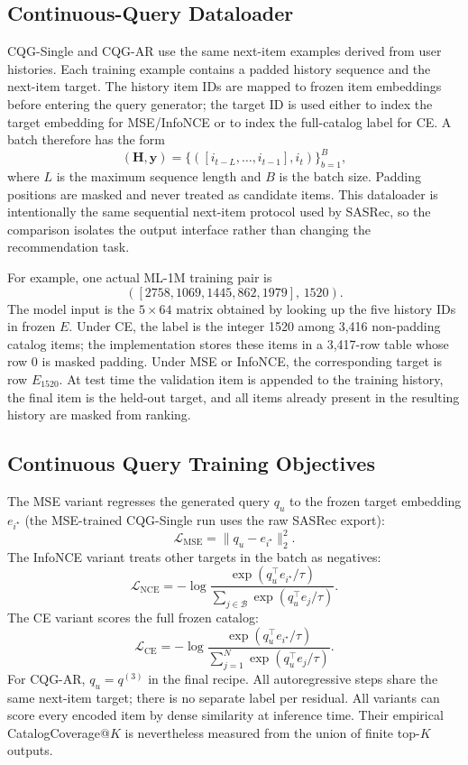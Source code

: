 \documentclass[letterpaper]{article}
\begin{document}
\subsection{Continuous-Query Dataloader}
\label{app:cqg_dataloader}

CQG-Single and CQG-AR use the same next-item examples derived from user histories. Each training example contains a padded history sequence and the next-item target. The history item IDs are mapped to frozen item embeddings before entering the query generator; the target ID is used either to index the target embedding for MSE/InfoNCE or to index the full-catalog label for CE. A batch therefore has the form
\[
(\mathbf{H}, \mathbf{y}) =
\{([i_{t-L},\ldots,i_{t-1}], i_t)\}_{b=1}^{B},
\]
where $L$ is the maximum sequence length and $B$ is the batch size. Padding positions are masked and never treated as candidate items. This dataloader is intentionally the same sequential next-item protocol used by SASRec, so the comparison isolates the output interface rather than changing the recommendation task.

For example, one actual ML-1M training pair is
\[
([2758,1069,1445,862,1979],\,1520).
\]
The model input is the \(5\times64\) matrix obtained by looking up the five
history IDs in frozen \(E\). Under CE, the label is the integer 1520 among
3,416 non-padding catalog items; the implementation stores these items in a
3,417-row table whose row 0 is masked padding. Under MSE or InfoNCE, the
corresponding target is row \(E_{1520}\). At test time the validation item is appended to the
training history, the final item is the held-out target, and all items already
present in the resulting history are masked from ranking.

\subsection{Continuous Query Training Objectives}
\label{app:cqg_losses}

The MSE variant regresses the generated query $q_u$ to the frozen target embedding $e_{i^\star}$ (the MSE-trained CQG-Single run uses the raw SASRec export):
\[
\mathcal{L}_{\mathrm{MSE}} =
\|q_u - e_{i^\star}\|_2^2.
\]
The InfoNCE variant treats other targets in the batch as negatives:
\[
\mathcal{L}_{\mathrm{NCE}} =
-\log
\frac{\exp(q_u^\top e_{i^\star}/\tau)}
{\sum_{j\in\mathcal{B}}\exp(q_u^\top e_j/\tau)}.
\]
The CE variant scores the full frozen catalog:
\[
\mathcal{L}_{\mathrm{CE}} =
-\log
\frac{\exp(q_u^\top e_{i^\star}/\tau)}
{\sum_{j=1}^{N}\exp(q_u^\top e_j/\tau)}.
\]
For CQG-AR, \(q_u=q^{(3)}\) in the final recipe.  All autoregressive steps
share the same next-item target; there is no separate label per residual.
All variants can score every encoded item by dense similarity at inference
time. Their empirical CatalogCoverage@$K$ is nevertheless measured from the
union of finite top-$K$ outputs.
\end{document}

